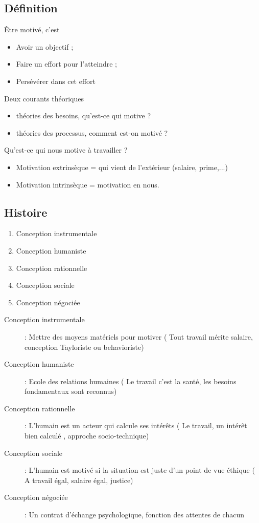 \documentclass[12pt]{article}
\begin{document}
	\subsection{Définition}
		Être motivé, c'est
		\begin{itemize}
			\item Avoir un objectif ;
			\item Faire un effort pour l'atteindre ;
			\item Persévérer dans cet effort
		 \end{itemize}

		 Deux courants théoriques
		 \begin{itemize}
		 	\item théories des besoins, qu'est-ce qui motive ?
			\item théories des processus, comment est-on motivé ?
		 \end{itemize}

		 Qu'est-ce qui nous motive à travailler ?
		 \begin{itemize}
		 	\item Motivation extrinsèque = qui vient de l'extérieur (salaire, prime,...)
			\item Motivation intrinsèque = motivation en nous.
		 \end{itemize}
	\subsection{Histoire}
	\begin{enumerate}
		\item Conception instrumentale
		\item Conception humaniste
		\item Conception rationnelle
		\item Conception sociale
		\item Conception négociée
	\end{enumerate}

	\begin{description}
		\item[Conception instrumentale] : Mettre des moyens matériels pour motiver (\og{} Tout travail mérite salaire\fg{}, conception Tayloriste ou behavioriste)
		\item[Conception humaniste] : Ecole des relations humaines (\og{} Le travail c'est la santé\fg{}, les besoins fondamentaux sont reconnus)
		\item[Conception rationnelle] : L'humain est un acteur qui calcule ses intérêts (\og{} Le travail, un intérêt bien calculé\fg{} , approche socio-technique)
		\item[Conception sociale] : L'humain est motivé si la situation est juste d'un point de vue éthique (\og{} A travail égal, salaire égal\fg{}, justice)
		\item[Conception négociée] : Un contrat d'échange psychologique, fonction des attentes de chacun
	\end{description}
\end{document}
